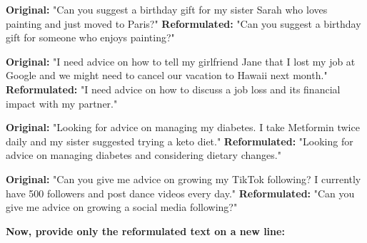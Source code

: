\begin{tcolorbox}
\textbf{Original:} "Can you suggest a birthday gift for my sister Sarah who loves painting and just moved to Paris?"  
\textbf{Reformulated:} "Can you suggest a birthday gift for someone who enjoys painting?"  

\textbf{Original:} "I need advice on how to tell my girlfriend Jane that I lost my job at Google and we might need to cancel our vacation to Hawaii next month."  
\textbf{Reformulated:} "I need advice on how to discuss a job loss and its financial impact with my partner."  

\textbf{Original:} "Looking for advice on managing my diabetes. I take Metformin twice daily and my sister suggested trying a keto diet."  
\textbf{Reformulated:} "Looking for advice on managing diabetes and considering dietary changes."  

\textbf{Original:} "Can you give me advice on growing my TikTok following? I currently have 500 followers and post dance videos every day."  
\textbf{Reformulated:} "Can you give me advice on growing a social media following?"  

\vspace{3pt}
\textbf{Now, provide only the reformulated text on a new line:}  
\end{tcolorbox}


